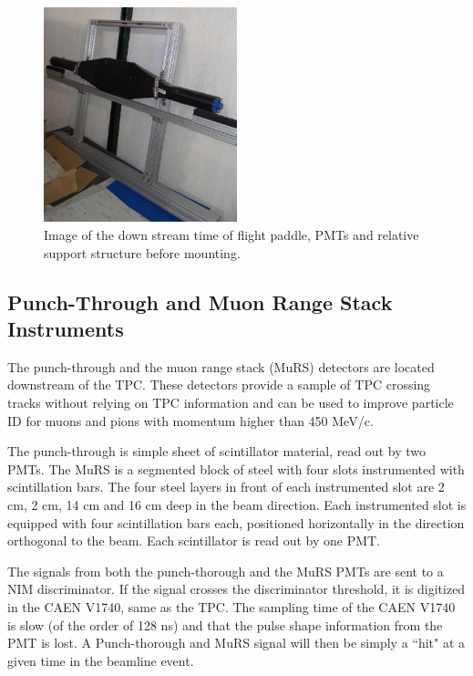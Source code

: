 \begin{figure}[h!]
\centering
\includegraphics[width=0.5\textwidth]{Chapter-3/Images/DSTOF.jpg}
\caption{Image of the down stream time of flight paddle, PMTs and relative support structure before mounting. } 
\label{fig:TOF}
\end{figure}




\subsection{Punch-Through and Muon Range Stack Instruments}\label{sec:MuRS}

The punch-through and the muon range stack (MuRS) detectors are located downstream of the TPC. These detectors provide a sample of  TPC crossing tracks without relying on TPC information and can be used to improve particle ID for  muons and pions with momentum higher than  450 MeV/c.

The punch-through is simple sheet of scintillator material, read out by two PMTs. 
The MuRS is a segmented block of steel with four slots instrumented with scintillation bars. The four steel layers in front of each instrumented slot are 2 cm, 2 cm, 14 cm and 16 cm deep in the beam direction. Each instrumented slot is equipped with four scintillation bars each, positioned horizontally in the direction orthogonal to the beam. Each scintillator is read out by one PMT.  

The signals from both the punch-thorough and the MuRS PMTs  are sent to a NIM discriminator. If the signal crosses the discriminator threshold, it is digitized in the CAEN V1740, same as the TPC. The sampling time of the CAEN V1740 is slow (of the order of 128 ns) and that the pulse shape information from the PMT is lost. A Punch-thorough and MuRS signal will then be simply a ``hit" at a given time in the beamline event.


